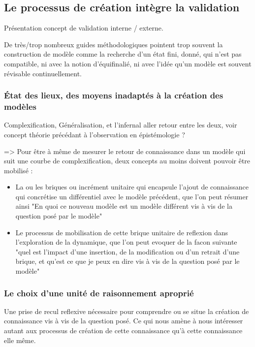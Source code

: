 \subsection{Le processus de création intègre la validation}

Présentation concept de validation interne / externe.

De très/trop nombreux guides méthodologiques pointent trop souvent la construction de modèle comme la recherche d'un état fini, donné, qui n'est pas compatible, ni avec la notion d'équifinalié, ni avec l'idée qu'un modèle est souvent révisable continuellement.

\subsubsection{État des lieux, des moyens inadaptés à la création des modèles}

Complexification, Généralisation, et l'infernal aller retour entre les deux, voir concept théorie précédant à l'observation en épistémologie ?

=> Pour être à même de mesurer le retour de connaissance dans un modèle qui suit une courbe de complexification, deux concepts au moins doivent pouvoir être mobilisé : 

\begin{itemize}
\item La ou les briques ou incrément unitaire qui encapsule l'ajout de connaissance qui concrétise un différentiel avec le modèle précédent, que l'on peut résumer ainsi "En quoi ce nouveau modèle est un modèle différent vis à vis de la question posé par le modèle"
\item Le processus de mobilisation de cette brique unitaire de reflexion dans l'exploration de la dynamique, que l'on peut evoquer de la facon suivante "quel est l'impact d'une insertion, de la modification ou d'un retrait d'une brique, et qu'est ce que je peux en dire vis à vis de la question posé par le modèle"
\end{itemize}

\subsubsection{Le choix d'une unité de raisonnement aproprié}

Une prise de recul reflexive nécessaire pour comprendre ou se situe la création de connaissance vis à vis de la question posé.
Ce qui nous amène à nous intéresser autant aux processus de création de cette connaissance qu'à cette connaissance elle même.

